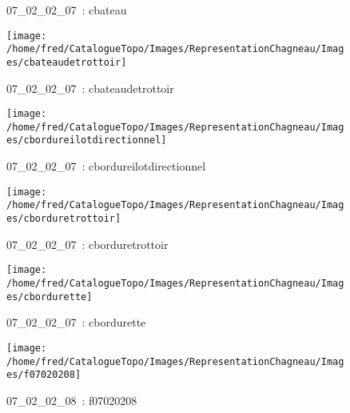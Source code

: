 \documentclass[12pt,titlepage]{book}
\begin{document}
\begin{figure}[h!]
\begin{minipage}[t]{3cm}
\begin{center}
      \caption[~07\_02\_02\_07]{\small{07\_02\_02\_07~:} \tiny{cbateau}}\label{cbateau}
    \end{center}
  \end{minipage}
  \begin{minipage}[t]{3cm}
    \begin{center}
      \texttt{[image: /home/fred/CatalogueTopo/Images/RepresentationChagneau/Images/cbateaudetrottoir]}
      \caption[~07\_02\_02\_07]{\small{07\_02\_02\_07~:} \tiny{cbateaudetrottoir}}\label{cbateaudetrottoir}
    \end{center}
  \end{minipage}
  \begin{minipage}[t]{3cm}
    \begin{center}
      \texttt{[image: /home/fred/CatalogueTopo/Images/RepresentationChagneau/Images/cbordureilotdirectionnel]}
      \caption[~07\_02\_02\_07]{\small{07\_02\_02\_07~:} \tiny{cbordureilotdirectionnel}}\label{cbordureilotdirectionnel}
    \end{center}
  \end{minipage}
  \begin{minipage}[t]{3cm}
    \begin{center}
      \texttt{[image: /home/fred/CatalogueTopo/Images/RepresentationChagneau/Images/cborduretrottoir]}
      \caption[~07\_02\_02\_07]{\small{07\_02\_02\_07~:} \tiny{cborduretrottoir}}\label{cborduretrottoir}
    \end{center}
  \end{minipage}
  \begin{minipage}[t]{3cm}
    \begin{center}
      \texttt{[image: /home/fred/CatalogueTopo/Images/RepresentationChagneau/Images/cbordurette]}
      \caption[~07\_02\_02\_07]{\small{07\_02\_02\_07~:} \tiny{cbordurette}}\label{cbordurette}
    \end{center}
  \end{minipage}
  \begin{minipage}[t]{3cm}
    \begin{center}
      \texttt{[image: /home/fred/CatalogueTopo/Images/RepresentationChagneau/Images/f07020208]}
      \caption[~07\_02\_02\_08]{\small{07\_02\_02\_08~:} \tiny{f07020208}}\label{f07020208}
    \end{center}
  \end{minipage}
\end{figure}
\end{document}
